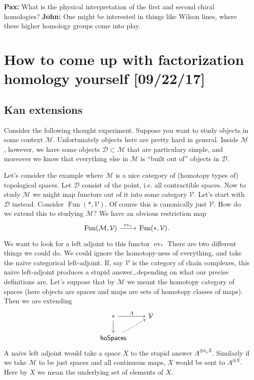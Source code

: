\documentclass{amsart}
\DeclareMathOperator{\Fun}{Fun}
\DeclareMathOperator{\ev}{ev}
\begin{document}
\textbf{Pax:} What is the physical interpretation of the first and second chiral
homologies? \textbf{John:} One might be interested in things like Wilson lines,
where these higher homology groups come into play.


\newpage
\section{How to come up with factorization homology yourself [09/22/17]}

\subsection{Kan extensions}

Consider the following
thought experiment. Suppose you want to study objects in some context $\mathcal{M}$.
Unfortunately objects here are pretty hard in general. Inside $\mathcal{M}$, however,
we have some objects $\mathcal{D}\subset \mathcal{M}$ that are particulary simple,
and moreover we know that everything else in $\mathcal{M}$ is ``built out of'' objects in $\mathcal{D}$.

Let's consider the example where $\mathcal{M}$ is a nice category of (homotopy types of)
topological spaces. Let $\mathcal{D}$ consist of the point, i.e. all contractible spaces.
Now to study $\mathcal{M}$ we might map functors out of it into some category $\mathcal{V}$.
Let's start with $\mathcal{D}$ instead. Consider $\Fun(*, \mathcal{V})$.
Of course this is canonically just $\mathcal{V}$. How do we extend this to studying $\mathcal{M}$?
We have an obvious restriction map
\begin{equation*}
    \begin{tikzcd}
        \Fun(\mathcal{M},\mathcal{V}) \rar{\ev_*} & \Fun(*, \mathcal{V}).
    \end{tikzcd}
\end{equation*}
We want to look for a left adjoint to this functor $\ev_*$
There are two different
things we could do. We could ignore the homotopy-ness of everything, and take the naive
categorical left-adjoint. If, say $\mathcal{V}$ is the category of chain complexes, this naive
left-adjoint produces a stupid answer\ldots depending on what our precise definitions are.
Let's suppose that by $\mathcal{M}$ we meant the homotopy category of spaces (here objects are spaces
and maps are sets of homotopy classes of maps).
Then we are extending
\begin{equation*}
    \begin{tikzcd}
        *\rar{A}\dar & \mathcal{V}\\
        \mathsf{hoSpaces}\urar[dashed]
    \end{tikzcd}
\end{equation*}
A naive left adjoint would take a space $X$ to the stupid answer $A^{\oplus \pi_0X}$.
Similarly if we take $\mathcal{M}$ to be just spaces and all continuous maps, $X$ would
be sent to $A^{\oplus X}$. Here by $X$ we mean the underlying set of elements of $X$.
\end{document}
